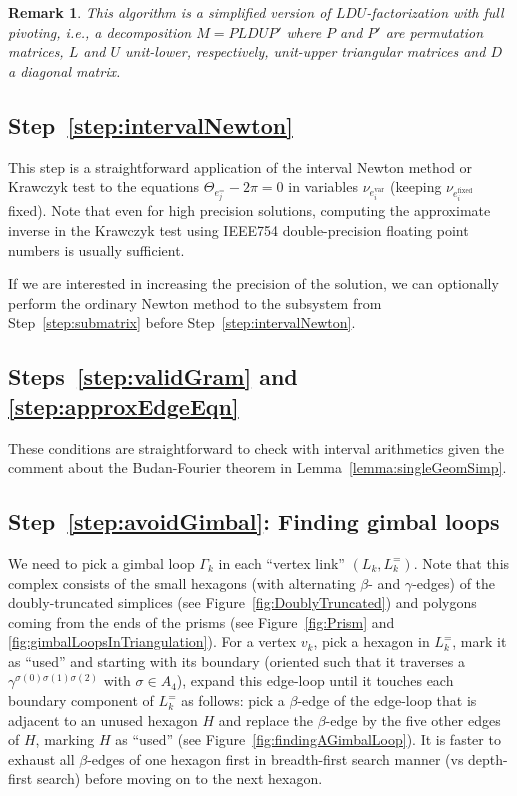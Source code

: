 \documentclass[utopia,fullpage]{nmd/article}
\newtheorem{remark}[theorem]{Remark}
\newcommand\myPath{\Gamma}
\begin{document}
\begin{remark}
This algorithm is a simplified version of $LDU$-factorization with full pivoting, i.e., a decomposition $M=PLDUP'$ where $P$ and $P'$ are permutation matrices, $L$ and $U$ unit-lower, respectively, unit-upper triangular matrices and $D$ a diagonal matrix.
 \end{remark}

\subsection{Step~\ref{step:intervalNewton}}

This step is a straightforward application of the interval Newton method or Krawczyk test to the equations $\Theta_{e^=_j}-2\pi = 0$ in variables $\nu_{e^\mathrm{var}_i}$ (keeping $\nu_{e^\mathrm{fixed}_i}$ fixed). Note that even for high precision solutions, computing the approximate inverse in the Krawczyk test using IEEE754 double-precision floating point numbers is usually sufficient.

If we are interested in increasing the precision of the solution, we can optionally perform the ordinary Newton method to the subsystem from Step~\ref{step:submatrix} before Step~\ref{step:intervalNewton}.

\subsection{Steps~\ref{step:validGram} and \ref{step:approxEdgeEqn}}

These conditions are straightforward to check with interval arithmetics given the comment about the Budan-Fourier theorem in Lemma~\ref{lemma:singleGeomSimp}.

\subsection{Step~\ref{step:avoidGimbal}: Finding gimbal loops}

We need to pick a gimbal loop $\myPath_k$ in each ``vertex link'' $(L_k,L^=_k)$. Note that this complex consists of the small hexagons (with alternating $\beta$- and $\gamma$-edges) of the doubly-truncated simplices (see Figure~\ref{fig:DoublyTruncated}) and polygons coming from the ends of the prisms (see Figure~\ref{fig:Prism} and \ref{fig:gimbalLoopsInTriangulation}). For a vertex $v_k$, pick a hexagon in $L^=_k$, mark it as ``used'' and starting with its boundary (oriented such that it traverses a $\gamma^{\sigma(0)\sigma(1)\sigma(2)}$ with $\sigma\in A_4$), expand this edge-loop until it touches each boundary component of $L^=_k$ as follows: pick a $\beta$-edge of the edge-loop that is adjacent to an unused hexagon $H$ and replace the $\beta$-edge by the five other edges of $H$, marking $H$ as ``used'' (see Figure~\ref{fig:findingAGimbalLoop}). It is faster to exhaust all $\beta$-edges of one hexagon first in breadth-first search manner (vs depth-first search) before moving on to the next hexagon.
\end{document}
